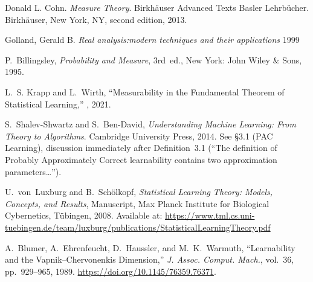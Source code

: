 \begin{thebibliography}{999}

    Donald L. Cohn.
    \textit{Measure Theory}.
    Birkhäuser Advanced Texts Basler Lehrbücher.
    Birkhäuser, New York, NY, second edition, 2013.

    Golland, Gerald B.
    \textit{Real analysis:modern techniques and their applications}
    1999

    P.~Billingsley, \emph{Probability and Measure}, 3rd~ed., New York: John Wiley \& Sons, 1995.

    L.~S. Krapp and L.~Wirth,
    \newblock ``Measurability in the Fundamental Theorem of Statistical Learning,''
    , 2021.

    S.~Shalev\hyp{}Shwartz and S.~Ben\hyp{}David,
    \emph{Understanding Machine Learning: From Theory to Algorithms}.
    Cambridge University Press, 2014.
    See \S3.1 (PAC Learning), discussion immediately after Definition~3.1
    (“The definition of Probably Approximately Correct learnability contains two approximation parameters…”).

    U.~von~Luxburg and B.~Sch{\"o}lkopf,
    \emph{Statistical Learning Theory: Models, Concepts, and Results},
    Manuscript, Max Planck Institute for Biological Cybernetics, T{\"u}bingen, 2008.
    Available at: \url{https://www.tml.cs.uni-tuebingen.de/team/luxburg/publications/StatisticalLearningTheory.pdf}

    A.~Blumer, A.~Ehrenfeucht, D.~Haussler, and M.~K.~Warmuth,
    ``Learnability and the Vapnik--Chervonenkis Dimension,''
    \emph{J. Assoc. Comput. Mach.}, vol.~36, pp.~929--965, 1989.
    \url{https://doi.org/10.1145/76359.76371}.


%
%
%
%


\end{thebibliography}
